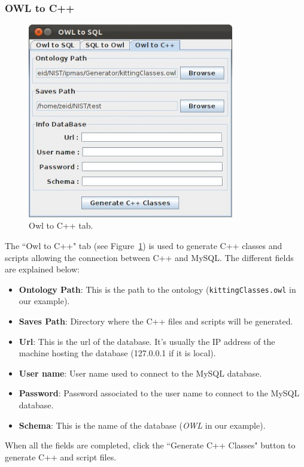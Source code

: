 \subsubsection{OWL to C++}
\begin{figure}[h!t!]
\centering
\includegraphics[width=9cm]{Figure/OWL2C++.jpeg}
\caption{Owl to C++ tab.}
\label{fig:owl2C++}
\end{figure}
The ``Owl to C++" tab (see Figure~\ref{fig:owl2C++}) is used to generate C++ classes and scripts allowing the connection between C++ and MySQL. The different fields are explained below:
\begin{itemize}
\item \textbf{Ontology Path}: This is the path to the ontology (\texttt{kittingClasses.owl} in our example).
\item \textbf{Saves Path}: Directory where the C++ files and scripts will be generated.
\item \textbf{Url}: This is the url of the database. It's usually the IP address of the machine hosting the database (127.0.0.1 if it is local).
\item \textbf{User name}: User name used to connect to the MySQL database.
\item \textbf{Password}: Password associated to the user name to connect to the MySQL database.
\item \textbf{Schema}: This is the name of the database (\textit{OWL} in our example).
\end{itemize}

When all the fields are completed, click the ``Generate C++ Classes" button to generate C++ and script files.